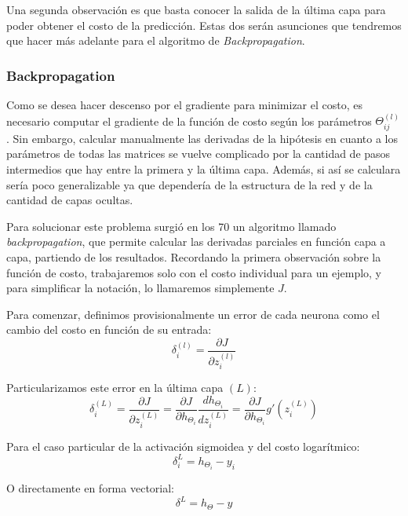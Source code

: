Una segunda observación es que basta conocer la salida de la última capa para poder obtener el costo de la predicción. Estas dos serán asunciones que tendremos que hacer más adelante para el algoritmo de \emph{Backpropagation}.

\subsubsection{Backpropagation} Como se desea hacer descenso por el gradiente para minimizar el costo, es necesario computar el gradiente de la función de costo según los parámetros $\Theta_{ij}^{(l)}$. Sin embargo, calcular manualmente las derivadas de la hipótesis en cuanto a los parámetros de todas las matrices se vuelve complicado por la cantidad de pasos intermedios que hay entre la primera y la última capa. Además, si así se calculara sería poco generalizable ya que dependería de la estructura de la red y de la cantidad de capas ocultas.

Para solucionar este problema surgió en los 70\cite{chap2} un algoritmo llamado \emph{backpropagation}, que permite calcular las derivadas parciales en función capa a capa, partiendo de los resultados. Recordando la primera observación sobre la función de costo, trabajaremos solo con el costo individual para un ejemplo, y para simplificar la notación, lo llamaremos simplemente $J$.

Para comenzar, definimos provisionalmente un error de cada neurona como el cambio del costo en función de su entrada:
\begin{equation}
\delta_i^{(l)} = \frac{\partial J}{\partial z_i^{(l)}}
\end{equation}

Particularizamos este error en la última capa $(L)$:
\begin{equation}
\delta_i^{(L)} = \frac{\partial J}{\partial z_i^{(L)}} = \frac{\partial J}{\partial h_{\Theta_i}}\frac{dh_{\Theta_i}}{dz_i^{(L)}} = \frac{\partial J}{\partial h_{\Theta_i}}g'(z_i^{(L)})
\end{equation}

Para el caso particular de la activación sigmoidea y del costo logarítmico:
\begin{equation}
\delta_i^{L} = h_{\Theta_i} - y_{i}
\end{equation}

O directamente en forma vectorial:
\begin{equation} \label{eq:errorFinal}
\delta^{L} = h_{\Theta} - y
\end{equation}

